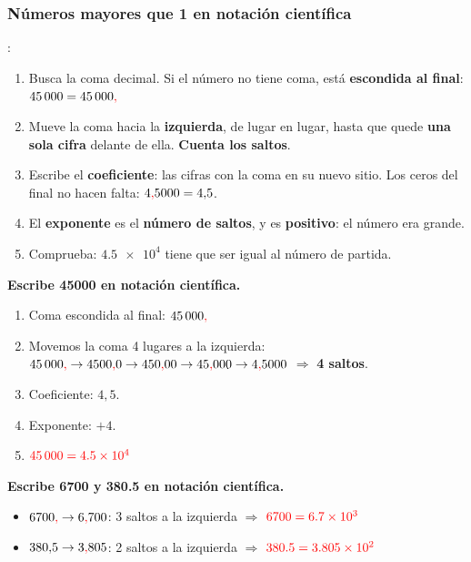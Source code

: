 \subsubsection{Números mayores que 1 en notación científica}

:
\begin{enumerate}[label=\numberballmDarkTeal]
    \item Busca la coma decimal. Si el número no tiene coma, está \textbf{escondida al final}: \(45\,000 = 45\,000\textcolor{red}{\mathbf{,}}\)
    \item Mueve la coma hacia la \textbf{izquierda}, de lugar en lugar, hasta que quede \textbf{una sola cifra} delante de ella. \textbf{Cuenta los saltos}.
    \item Escribe el \textbf{coeficiente}: las cifras con la coma en su nuevo sitio. Los ceros del final no hacen falta: \(4\textcolor{red}{\mathbf{,}} 5000 = 4{,}5\).
    \item El \textbf{exponente} es el \textbf{número de saltos}, y es \textbf{positivo}: el número era grande.
    \item Comprueba: \(\num{4.5e4}\) tiene que ser igual al número de partida.
\end{enumerate}

\begin{example}
    \textbf{Escribe \num{45000} en notación científica.}
    \begin{enumerate}[label=\numberballmDarkTeal]
        \item Coma escondida al final: \(45\,000\textcolor{red}{\mathbf{,}}\)
        \item Movemos la coma 4 lugares a la izquierda: \(45\,000\textcolor{red}{\mathbf{,}} \to 4500\textcolor{red}{\mathbf{,}} 0 \to 450\textcolor{red}{\mathbf{,}} 00 \to 45\textcolor{red}{\mathbf{,}} 000 \to 4\textcolor{red}{\mathbf{,}} 5000\) \(\Rightarrow\) \textbf{4 saltos}.
        \item Coeficiente: \(4{,}5\).
        \item Exponente: \(+4\).
        \item \(\textcolor{red}{\num{45000} = \num{4.5e4}}\)
    \end{enumerate}
\end{example}

\begin{example}
    \textbf{Escribe \num{6700} y \num{380.5} en notación científica.}
    \begin{itemize}
        \item \(6700\textcolor{red}{\mathbf{,}} \to 6\textcolor{red}{\mathbf{,}} 700\): 3 saltos a la izquierda \(\Rightarrow\) \(\textcolor{red}{\num{6700} = \num{6.7e3}}\)
        \item \(380{,}5 \to 3\textcolor{red}{\mathbf{,}} 805\): 2 saltos a la izquierda \(\Rightarrow\) \(\textcolor{red}{\num{380.5} = \num{3.805e2}}\)
    \end{itemize}
\end{example}

